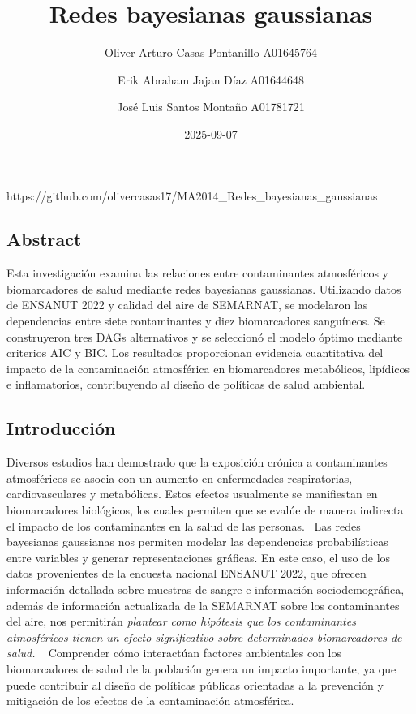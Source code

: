 \documentclass[
  11pt,
  a4paper,
]{article}
\title{Redes bayesianas gaussianas}
\author{Oliver Arturo Casas Pontanillo \textbar{} A01645764 \and Erik
Abraham Jajan Díaz \textbar{} A01644648 \and José Luis Santos Montaño
\textbar{} A01781721}
\date{2025-09-07}
\renewcommand*\contentsname{Table of contents}
\newcommand\contentsname{Table of contents}
\begin{document}
\maketitle

\renewcommand*\contentsname{Table of contents}
{
\hypersetup{linkcolor=}
\setcounter{tocdepth}{3}
\tableofcontents
}

https://github.com/olivercasas17/MA2014\_Redes\_bayesianas\_gaussianas

\subsection{Abstract}\label{abstract}

Esta investigación examina las relaciones entre contaminantes
atmosféricos y biomarcadores de salud mediante redes bayesianas
gaussianas. Utilizando datos de ENSANUT 2022 y calidad del aire de
SEMARNAT, se modelaron las dependencias entre siete contaminantes y diez
biomarcadores sanguíneos. Se construyeron tres DAGs alternativos y se
seleccionó el modelo óptimo mediante criterios AIC y BIC. Los resultados
proporcionan evidencia cuantitativa del impacto de la contaminación
atmosférica en biomarcadores metabólicos, lipídicos e inflamatorios,
contribuyendo al diseño de políticas de salud ambiental.

\subsection{Introducción}\label{introducciuxf3n}

Diversos estudios han demostrado que la exposición crónica a
contaminantes atmosféricos se asocia con un aumento en enfermedades
respiratorias, cardiovasculares y metabólicas. Estos efectos usualmente
se manifiestan en biomarcadores biológicos, los cuales permiten que se
evalúe de manera indirecta el impacto de los contaminantes en la salud
de las personas.~ Las redes bayesianas gaussianas nos permiten modelar
las dependencias probabilísticas entre variables y generar
representaciones gráficas. En este caso, el uso de los datos
provenientes de la encuesta nacional ENSANUT 2022, que ofrecen
información detallada sobre muestras de sangre e información
sociodemográfica, además de información actualizada de la SEMARNAT sobre
los contaminantes del aire, nos permitirán \emph{plantear como hipótesis
que los contaminantes atmosféricos tienen un efecto significativo sobre
determinados biomarcadores de salud.} ~ Comprender cómo interactúan
factores ambientales con los biomarcadores de salud de la población
genera un impacto importante, ya que puede contribuir al diseño de
políticas públicas orientadas a la prevención y mitigación de los
efectos de la contaminación atmosférica.
\end{document}
